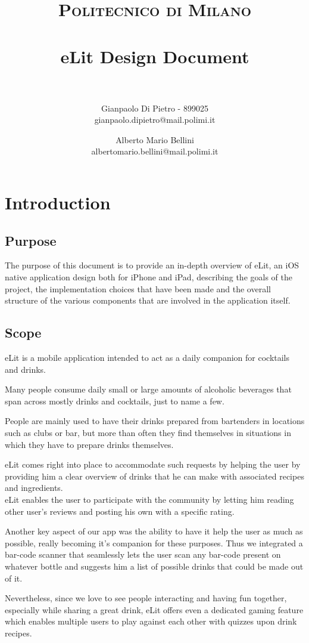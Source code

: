 \documentclass[paper=a4, fontsize=12pt]{scrartcl}
\title{
		\usefont{OT1}{bch}{b}{n}
		\normalfont \normalsize \textsc{Politecnico di Milano} \\ [25pt]
		\horrule{1pt} \\[0.4cm]
		\huge eLit Design Document \\
		\horrule{2pt} \\[0.5cm]
}
\author{
		\normalfont 								\normalsize
        Gianpaolo Di Pietro - 899025\\[-3pt]                \normalsize
        gianpaolo.dipietro@mail.polimi.it\\[-3pt]		\normalsize
        \and
        \normalfont 								\normalsize
        Alberto Mario Bellini\\[-3pt]                \normalsize
        albertomario.bellini@mail.polimi.it\\[-3pt]		\normalsize
}
\date{}
\numberwithin{equation}{section}		%
\numberwithin{figure}{section}			%
\numberwithin{table}{section}				%
\begin{document}
\maketitle
\newpage
\tableofcontents
\newpage

\section{Introduction}

\subsection{Purpose}
The purpose of this document is to provide an in-depth overview of eLit, an iOS native application design both for iPhone and iPad, describing the goals of the project, the implementation choices that have been made and the overall structure of the various components that are involved in the application itself.

\subsection{Scope}
eLit is a mobile application intended to act as a daily companion for cocktails and drinks.

Many people consume daily small or large amounts of alcoholic beverages that span across mostly drinks and cocktails, just to name a few.

People are mainly used to have their drinks prepared from bartenders in locations such as clubs or bar, but more than often they find themselves in situations in which they have to prepare drinks themselves.

eLit comes right into place to accommodate such requests by helping the user by providing him a clear overview of drinks that he can make with associated recipes and ingredients.\\
eLit enables the user to participate with the community by letting him reading other user's reviews and posting his own with a specific rating.

Another key aspect of our app was the ability to have it help the user as much as possible, really becoming it's companion for these purposes.
Thus we integrated a bar-code scanner that seamlessly lets the user scan any bar-code present on whatever bottle and suggests him a list of possible drinks that could be made out of it.

Nevertheless, since we love to see people interacting and having fun together, especially while sharing a great drink, eLit offers even a dedicated gaming feature which enables multiple users to play against each other with quizzes upon drink recipes.
\end{document}
